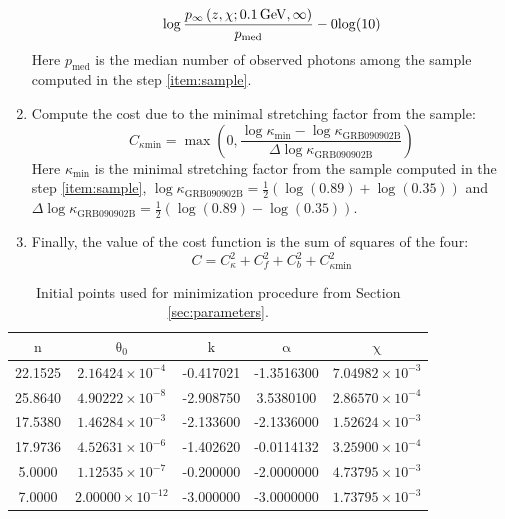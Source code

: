 \documentclass[manuscript]{aastex}
\begin{document}
\begin{enumerate}
{\begin{equation}
{				\log{\frac{
					p_{\infty} \left(z,\chi;\unit[0.1]{GeV},\infty\right)
				}{
					p_\text{med}
				}} - 0
			}{\log(10)}
		\end{equation}
		Here $p_\text{med}$ is the median number of observed photons among the sample computed in the step \ref{item:sample}.
	}
	\item{
		Compute the cost due to the minimal stretching factor from the sample:
		\begin{equation}
			C_{\kappa\text{min}} = \max\left(0, 
				\frac{
					\log{\kappa_\text{min}} - \log{\kappa_{\text{GRB090902B}}}
				}{\Delta\log\kappa_{\text{GRB090902B}}}\right)
		\end{equation}
		Here $\kappa_\text{min}$ is the minimal stretching factor from the sample computed in the step \ref{item:sample}, $\log\kappa_{\text{GRB090902B}} = \frac{1}{2}\left(\log\left(0.89\right) + \log\left(0.35\right)\right)$ and $\Delta\log\kappa_{\text{GRB090902B}} = \frac{1}{2}\left(\log\left(0.89\right) - \log\left(0.35\right)\right)$.
	}
	\item{
		Finally, the value of the cost function is the sum of squares of the four:
		\begin{equation}
			C = C_\kappa^2 + C_f^2 + C_b^2 + C_{\kappa\text{min}}^2
		\end{equation}
	}
\end{enumerate}

\begin{table}
	\centering
	\small
	\begin{tabular}{ c | c | c | c | c }
		$\mathrm{n}$ & $\mathrm{\theta_0}$ & $\mathrm{k}$ & $\mathrm{\alpha}$ & $\mathrm{\chi}$ \\
		\hline
		22.1525	&	$\mathrm{2.16424 \times 10^{-4}}$ 	&	-0.417021  	&	-1.3516300 	&	$\mathrm{7.04982 \times 10^{-3}}$	\\
		25.8640	&	$\mathrm{4.90222 \times 10^{-8}}$	&	-2.908750 	&	 3.5380100 	&	$\mathrm{2.86570 \times 10^{-4}}$ 	\\
		17.5380	&	$\mathrm{1.46284 \times 10^{-3}}$ 	&	-2.133600 	&	-2.1336000 	&	$\mathrm{1.52624 \times 10^{-3}}$ 	\\
		17.9736	&	$\mathrm{4.52631 \times 10^{-6}}$	&	-1.402620 	&	-0.0114132 	&	$\mathrm{3.25900 \times 10^{-4}}$ 	\\
		 5.0000	&	$\mathrm{1.12535 \times 10^{-7}}$	&	-0.200000	&	-2.0000000 	&	$\mathrm{4.73795 \times 10^{-3}}$ 	\\
		 7.0000	&	$\mathrm{2.00000 \times 10^{-12}}$	&	-3.000000	&	-3.0000000	&	$\mathrm{1.73795 \times 10^{-3}}$
	\end{tabular}
	\caption{Initial points used for minimization procedure from Section \ref{sec:parameters}.}
	\label{tab:fitInitialPoints}
\end{table}
\end{document}
